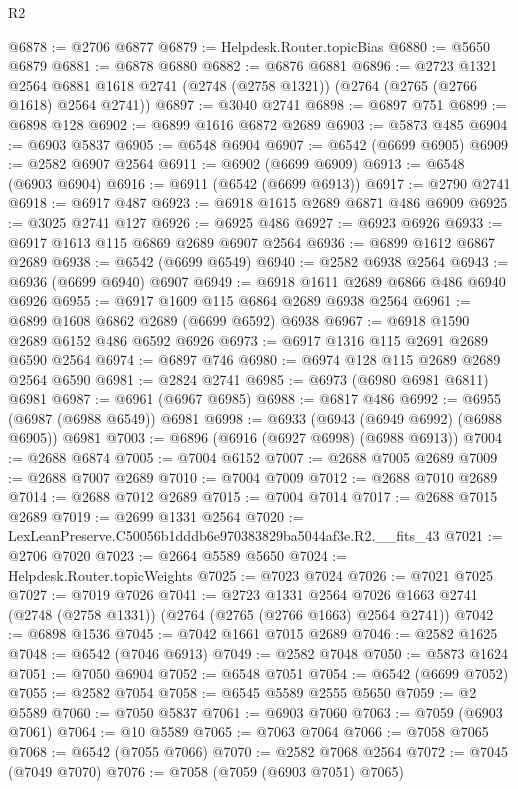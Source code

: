 \begin{lexlean}{R2}
\begin{coremodule}
@6878 := @2706 @6877
@6879 := Helpdesk.Router.topicBias
@6880 := @5650 @6879
@6881 := @6878 @6880
@6882 := @6876 @6881
@6896 := @2723
    @1321
    @2564
    @6881
    @1618
    @2741
    (@2748 (@2758 @1321))
    (@2764 (@2765 (@2766 @1618) @2564 @2741))
@6897 := @3040 @2741
@6898 := @6897 @751
@6899 := @6898 @128
@6902 := @6899 @1616 @6872 @2689
@6903 := @5873 @485
@6904 := @6903 @5837
@6905 := @6548 @6904
@6907 := @6542 (@6699 @6905)
@6909 := @2582 @6907 @2564
@6911 := @6902 (@6699 @6909)
@6913 := @6548 (@6903 @6904)
@6916 := @6911 (@6542 (@6699 @6913))
@6917 := @2790 @2741
@6918 := @6917 @487
@6923 := @6918 @1615 @2689 @6871 @486 @6909
@6925 := @3025 @2741 @127
@6926 := @6925 @486
@6927 := @6923 @6926
@6933 := @6917 @1613 @115 @6869 @2689 @6907 @2564
@6936 := @6899 @1612 @6867 @2689
@6938 := @6542 (@6699 @6549)
@6940 := @2582 @6938 @2564
@6943 := @6936 (@6699 @6940) @6907
@6949 := @6918 @1611 @2689 @6866 @486 @6940 @6926
@6955 := @6917 @1609 @115 @6864 @2689 @6938 @2564
@6961 := @6899 @1608 @6862 @2689 (@6699 @6592) @6938
@6967 := @6918 @1590 @2689 @6152 @486 @6592 @6926
@6973 := @6917 @1316 @115 @2691 @2689 @6590 @2564
@6974 := @6897 @746
@6980 := @6974 @128 @115 @2689 @2689 @2564 @6590
@6981 := @2824 @2741
@6985 := @6973 (@6980 @6981 @6811) @6981
@6987 := @6961 (@6967 @6985)
@6988 := @6817 @486
@6992 := @6955 (@6987 (@6988 @6549)) @6981
@6998 := @6933 (@6943 (@6949 @6992) (@6988 @6905)) @6981
@7003 := @6896 (@6916 (@6927 @6998) (@6988 @6913))
@7004 := @2688 @6874
@7005 := @7004 @6152
@7007 := @2688 @7005 @2689
@7009 := @2688 @7007 @2689
@7010 := @7004 @7009
@7012 := @2688 @7010 @2689
@7014 := @2688 @7012 @2689
@7015 := @7004 @7014
@7017 := @2688 @7015 @2689
@7019 := @2699 @1331 @2564
@7020 := LexLeanPreserve.C50056b1dddb6e970383829ba5044af3e.R2.__fits_43
@7021 := @2706 @7020
@7023 := @2664 @5589 @5650
@7024 := Helpdesk.Router.topicWeights
@7025 := @7023 @7024
@7026 := @7021 @7025
@7027 := @7019 @7026
@7041 := @2723
    @1331
    @2564
    @7026
    @1663
    @2741
    (@2748 (@2758 @1331))
    (@2764 (@2765 (@2766 @1663) @2564 @2741))
@7042 := @6898 @1536
@7045 := @7042 @1661 @7015 @2689
@7046 := @2582 @1625
@7048 := @6542 (@7046 @6913)
@7049 := @2582 @7048
@7050 := @5873 @1624
@7051 := @7050 @6904
@7052 := @6548 @7051
@7054 := @6542 (@6699 @7052)
@7055 := @2582 @7054
@7058 := @6545 @5589 @2555 @5650
@7059 := @2 @5589
@7060 := @7050 @5837
@7061 := @6903 @7060
@7063 := @7059 (@6903 @7061)
@7064 := @10 @5589
@7065 := @7063 @7064
@7066 := @7058 @7065
@7068 := @6542 (@7055 @7066)
@7070 := @2582 @7068 @2564
@7072 := @7045 (@7049 @7070)
@7076 := @7058 (@7059 (@6903 @7051) @7065)

\end{coremodule}
\end{lexlean}
